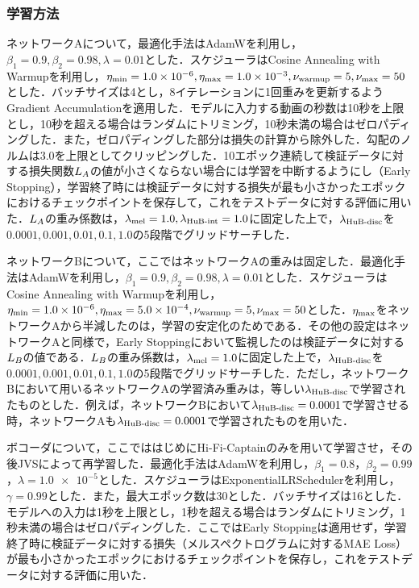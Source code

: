 \subsubsection{学習方法}
ネットワークAについて，最適化手法はAdamW\cite{loshchilov2017decoupled}を利用し，$\beta_{1} = 0.9, \beta_{2} = 0.98, \lambda = 0.01$とした．スケジューラはCosine Annealing with Warmupを利用し，$\eta_{\text{min}} = 1.0 \times 10^{-6}, \eta_{\text{max}} = 1.0 \times 10^{-3}, \nu_{\text{warmup}} = 5, \nu_{\text{max}} = 50$とした．バッチサイズは4とし，8イテレーションに1回重みを更新するようGradient Accumulationを適用した．モデルに入力する動画の秒数は10秒を上限とし，10秒を超える場合はランダムにトリミング，10秒未満の場合はゼロパディングした．また，ゼロパディングした部分は損失の計算から除外した．勾配のノルムは3.0を上限としてクリッピングした．10エポック連続して検証データに対する損失関数$L_{A}$の値が小さくならない場合には学習を中断するようにし（Early Stopping），学習終了時には検証データに対する損失が最も小さかったエポックにおけるチェックポイントを保存して，これをテストデータに対する評価に用いた．$L_{A}$の重み係数は，$\lambda_{\text{mel}} = 1.0, \lambda_{\text{HuB-int}} = 1.0$に固定した上で，$\lambda_{\text{HuB-disc}}$を$0.0001, 0.001, 0.01, 0.1, 1.0$の5段階でグリッドサーチした．

ネットワークBについて，ここではネットワークAの重みは固定した．最適化手法はAdamWを利用し，$\beta_{1} = 0.9, \beta_{2} = 0.98, \lambda = 0.01$とした．スケジューラはCosine Annealing with Warmupを利用し，$\eta_{\text{min}} = 1.0 \times 10^{-6}, \eta_{\text{max}} = 5.0 \times 10^{-4}, \nu_{\text{warmup}} = 5, \nu_{\text{max}} = 50$とした．$\eta_{\text{max}}$をネットワークAから半減したのは，学習の安定化のためである．その他の設定はネットワークAと同様で，Early Stoppingにおいて監視したのは検証データに対する$L_{B}$の値である．$L_{B}$の重み係数は，$\lambda_{\text{mel}} = 1.0$に固定した上で，$\lambda_{\text{HuB-disc}}$を$0.0001, 0.001, 0.01, 0.1, 1.0$の5段階でグリッドサーチした．ただし，ネットワークBにおいて用いるネットワークAの学習済み重みは，等しい$\lambda_{\text{HuB-disc}}$で学習されたものとした．例えば，ネットワークBにおいて$\lambda_{\text{HuB-disc}} = 0.0001$で学習させる時，ネットワークAも$\lambda_{\text{HuB-disc}} = 0.0001$で学習されたものを用いた．

ボコーダについて，ここでははじめにHi-Fi-Captainのみを用いて学習させ，その後JVSによって再学習した．最適化手法はAdamWを利用し，$\beta_{1} = 0.8$，$\beta_{2} = 0.99$，$\lambda = \num{1.0e-5}$とした．スケジューラはExponentialLRSchedulerを利用し，$\gamma = 0.99$とした．また，最大エポック数は30とした．バッチサイズは16とした．モデルへの入力は1秒を上限とし，1秒を超える場合はランダムにトリミング，1秒未満の場合はゼロパディングした．ここではEarly Stoppingは適用せず，学習終了時に検証データに対する損失（メルスペクトログラムに対するMAE Loss）が最も小さかったエポックにおけるチェックポイントを保存し，これをテストデータに対する評価に用いた．

